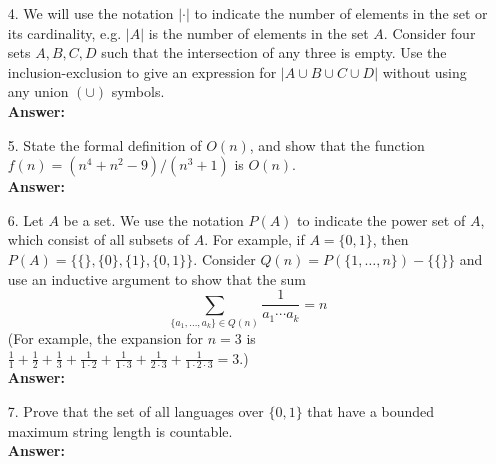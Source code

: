 \documentclass[12pt]{amsart}
\begin{document}
\begin{itemize}
\vspace{.2in}
\item[{\rm 4.}]  We will use the notation $|\cdot |$ to indicate the number of elements in the set or its cardinality, e.g. $|A|$ is the number of elements in the set $A$.  Consider four sets $A, B, C, D$ such that the intersection of any three is empty.  Use the inclusion-exclusion to give an expression for $|A\cup B\cup C\cup D|$ without using any union $(\cup)$ symbols.
\\[.2in]\textbf{Answer:}
 
\vspace{.2in}
\item[{\rm 5.}]  State the formal definition of $O(n)$, and show that the function $f(n) = (n^4 + n^2-9)/(n^3+1)$ is $O(n)$.
\\[.2in]\textbf{Answer:}

\vspace{.2in}
\item[{\rm 6.}]  Let $A$ be a set.  We use the notation $P(A)$ to indicate the power set of $A$, which consist of all subsets of $A$.  For example, if $A=\{0,1\}$, then $P(A)=\{\{\},\{0\},\{1\},\{0,1\}\}$.  Consider $Q(n) = P(\{1, \ldots, n\}) -\{\{\}\}$ and use an inductive argument to show that the sum 
\[\sum_{\{a_1, \ldots, a_k\} \in Q(n)}\frac{1}{a_1 \cdots a_k} = n \]
(For example, the expansion for $n=3$ is $\frac{1}{1}+\frac{1}{2}+\frac{1}{3} + \frac{1}{1\cdot 2}+\frac{1}{1\cdot 3} + \frac{1}{2\cdot 3}+\frac{1}{1\cdot 2\cdot 3} = 3$.)
\\[.2in]\textbf{Answer:}

\vspace{.2in}
\item[{\rm 7.}]  Prove that the set of all languages over $\{0, 1\}$ that have a bounded maximum string length is countable.
\\[.2in]\textbf{Answer:}

\end{itemize}
 
 
\end{document}
